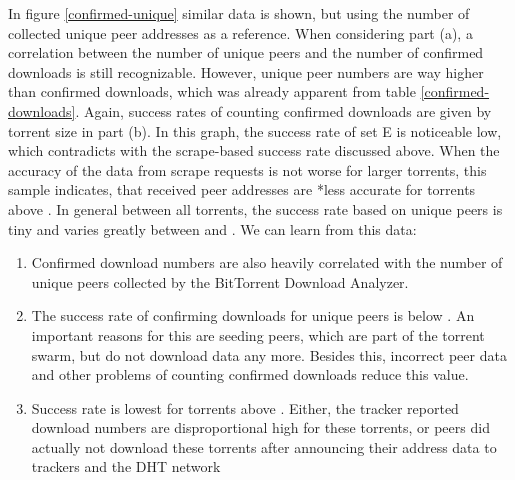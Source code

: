 \documentclass[10pt, a4paper, twoside, headsepline]{scrbook}
\renewcommand{\_}{\origunderscore\allowbreak}
\begin{document}
In figure \ref{confirmed-unique} similar data is shown, but using the number of collected unique peer addresses as a reference. When considering part (a), a correlation between the number of unique peers and the number of confirmed downloads is still recognizable. However, unique peer numbers are way higher than confirmed downloads, which was already apparent from table \ref{confirmed-downloads}. Again, success rates of counting confirmed downloads are given by torrent size in part (b). In this graph, the success rate of set E is noticeable low, which contradicts with the scrape-based success rate discussed above. When the accuracy of the data from scrape requests is not worse for larger torrents, this sample indicates, that received peer addresses are *less accurate for torrents above . In general between all torrents, the success rate based on unique peers is tiny and varies greatly between  and . We can learn from this data:
\begin{enumerate}
\item Confirmed download numbers are also heavily correlated with the number of unique peers collected by the BitTorrent Download Analyzer.
\item The success rate of confirming downloads for unique peers is below . An important reasons for this are seeding peers, which are part of the torrent swarm, but do not download data any more. Besides this, incorrect peer data and other problems of counting confirmed downloads reduce this value.
\item Success rate is lowest for torrents above . Either, the tracker reported download numbers are disproportional high for these torrents, or peers did actually not download these torrents after announcing their address data to trackers and the DHT network
\end{enumerate}
\end{document}
